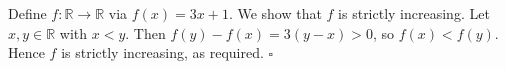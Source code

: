 Define $f : \mathbb{R} \to \mathbb{R}$ via $f(x) = 3x + 1$.
We show that $f$ is strictly increasing.
Let $x, y \in \mathbb{R}$ with $x < y$.
Then $f(y) - f(x) = 3(y - x) > 0$, so $f(x) < f(y)$.
Hence $f$ is strictly increasing, as required. \hfill$\square$